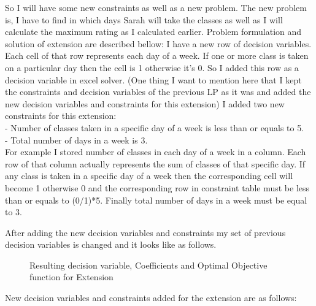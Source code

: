\documentclass[paper=letter, fontsize=11pt]{scrartcl} %
\begin{document}
So I will have some new constraints as well as a new problem. The new problem is, I have to find in which days Sarah will take the classes as well as I will calculate the maximum rating as I calculated earlier. Problem formulation and solution of extension are described bellow:\newline
I have a new row of decision variables. Each cell of that row represents each day of a week. If one or more class is taken on a particular day then the cell is 1 otherwise it's 0. So I added this row as a decision variable in excel solver. (One thing I want to mention here that I kept the constraints and decision variables of the previous LP as it was and added the new decision variables and constraints for this extension)
I added two new constraints for this extension:\\
- Number of classes taken in a specific day of a week is less than or equals to 5.\\
- Total number of days in a week is 3.\\

For example I stored number of classes in each day of a week in a column. Each row of that column actually represents the sum of classes of that specific day. If any class is taken in a specific day of a week then the corresponding cell will become 1 otherwise 0 and the corresponding row in constraint table must be less than or equals to (0/1)*5.  Finally total number of days in a week must be equal to 3. 

After adding the new decision variables and constraints my set of previous decision variables is changed and it looks like as follows.
\begin{figure}[H]
  
  \centering
    \caption{Resulting decision variable, Coefficients and Optimal Objective function for Extension}
\end{figure}
\newline
New decision variables and constraints added for the extension are as follows:
\end{document}
